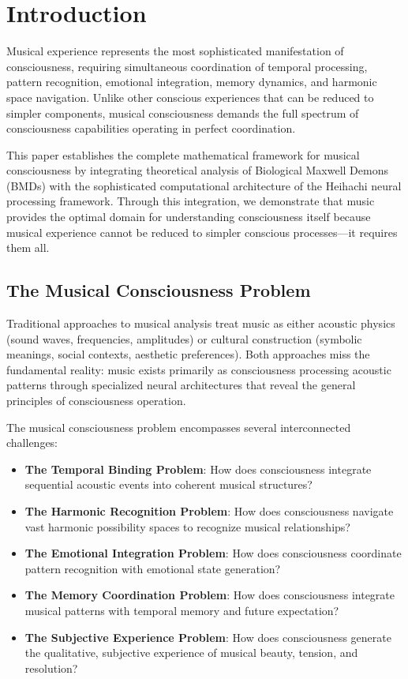 \documentclass[12pt,a4paper]{article}
\begin{document}
\section{Introduction}

Musical experience represents the most sophisticated manifestation of consciousness, requiring simultaneous coordination of temporal processing, pattern recognition, emotional integration, memory dynamics, and harmonic space navigation. Unlike other conscious experiences that can be reduced to simpler components, musical consciousness demands the full spectrum of consciousness capabilities operating in perfect coordination.

This paper establishes the complete mathematical framework for musical consciousness by integrating theoretical analysis of Biological Maxwell Demons (BMDs) with the sophisticated computational architecture of the Heihachi neural processing framework. Through this integration, we demonstrate that music provides the optimal domain for understanding consciousness itself because musical experience cannot be reduced to simpler conscious processes—it requires them all.

\subsection{The Musical Consciousness Problem}

Traditional approaches to musical analysis treat music as either acoustic physics (sound waves, frequencies, amplitudes) or cultural construction (symbolic meanings, social contexts, aesthetic preferences). Both approaches miss the fundamental reality: music exists primarily as consciousness processing acoustic patterns through specialized neural architectures that reveal the general principles of consciousness operation.

The musical consciousness problem encompasses several interconnected challenges:

\begin{itemize}
\item \textbf{The Temporal Binding Problem}: How does consciousness integrate sequential acoustic events into coherent musical structures?
\item \textbf{The Harmonic Recognition Problem}: How does consciousness navigate vast harmonic possibility spaces to recognize musical relationships?
\item \textbf{The Emotional Integration Problem}: How does consciousness coordinate pattern recognition with emotional state generation?
\item \textbf{The Memory Coordination Problem}: How does consciousness integrate musical patterns with temporal memory and future expectation?
\item \textbf{The Subjective Experience Problem}: How does consciousness generate the qualitative, subjective experience of musical beauty, tension, and resolution?
\end{itemize}
\end{document}
